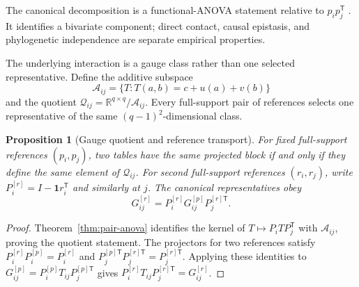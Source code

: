 \documentclass[10pt]{article}
\newcommand{\R}{\mathbb R}
\newtheorem{proposition}[theorem]{Proposition}
\theoremstyle{definition}
\theoremstyle{remark}
\begin{document}
The canonical decomposition is a functional-ANOVA statement relative to $p_ip_j^{\mathsf T}$
\cite{hoeffding1948}.  It
identifies a bivariate component; direct contact, causal epistasis, and phylogenetic
independence are separate empirical properties.

The underlying interaction is a gauge class rather than one selected representative.  Define the
additive subspace
\begin{equation}
\mathcal A_{ij}
=\{T:T(a,b)=c+u(a)+v(b)\}
\end{equation}
and the quotient $\mathcal Q_{ij}=\R^{q\times q}/\mathcal A_{ij}$.  Every full-support pair of
references selects one representative of the same $(q-1)^2$-dimensional class.

\begin{proposition}[Gauge quotient and reference transport]
\label{prop:reference-transport}
For fixed full-support references $(p_i,p_j)$, two tables have the same projected block if and only
if they define the same element of $\mathcal Q_{ij}$.  For second full-support references
$(r_i,r_j)$, write $P_i^{[r]}=I-\mathbf1r_i^{\mathsf T}$ and similarly at $j$.  The canonical
representatives obey
\begin{equation}
\boxed{
G_{ij}^{[r]}=P_i^{[r]}G_{ij}^{[p]}P_j^{[r]\mathsf T}.}
\label{eq:reference-transport}
\end{equation}
\end{proposition}

\begin{proof}
Theorem~\ref{thm:pair-anova} identifies the kernel of
$T\mapsto P_iTP_j^{\mathsf T}$ with $\mathcal A_{ij}$, proving the quotient statement.  The
projectors for two references satisfy
$P_i^{[r]}P_i^{[p]}=P_i^{[r]}$ and
$P_j^{[p]\mathsf T}P_j^{[r]\mathsf T}=P_j^{[r]\mathsf T}$.  Applying these identities to
$G_{ij}^{[p]}=P_i^{[p]}T_{ij}P_j^{[p]\mathsf T}$ gives
$P_i^{[r]}T_{ij}P_j^{[r]\mathsf T}=G_{ij}^{[r]}$.
\end{proof}
\end{document}
